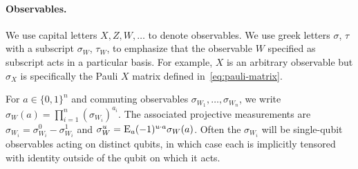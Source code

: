 \documentclass[11pt,letter]{article}
\theoremstyle{remark}
\theoremstyle{definition}
\newcommand{\Es}[1]{\ensuremath{\mathop{\textsc{E}}}_{#1}}
\begin{document}
\paragraph{Observables.}
We use capital letters $X,Z,W,\ldots$ to denote observables. We use greek letters $\sigma$, $\tau$ with a subscript $\sigma_W$, $\tau_W$, to emphasize that the observable $W$ specified as subscript acts in a particular basis. For example, $X$ is an arbitrary observable but $\sigma_X$ is specifically the Pauli $X$ matrix defined in~\eqref{eq:pauli-matrix}.

For $a\in\{0,1\}^n$ and commuting observables $\sigma_{W_1},\ldots,\sigma_{W_n}$, we write $\sigma_W(a) = \prod_{i=1}^n (\sigma_{W_i})^{a_i}$. The associated projective measurements are $\sigma_{W_i} = \sigma_{W_i}^0 - \sigma_{W_i}^1$ and $\sigma_W^u = \Es{a} (-1)^{u\cdot a} \sigma_W(a)$.  Often the $\sigma_{W_i}$ will be single-qubit observables acting on distinct qubits, in which case each is implicitly tensored with identity outside of the qubit on which it acts. 
\end{document}
